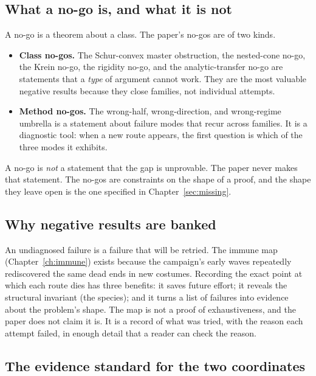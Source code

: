 \subsection{What a no-go is, and what it is not}

A no-go is a theorem about a class. The paper's no-gos are of two kinds.
\begin{itemize}
\item \textbf{Class no-gos.} The Schur-convex master obstruction, the nested-cone no-go, the
  Krein no-go, the rigidity no-go, and the analytic-transfer no-go are statements that a
  \emph{type} of argument cannot work. They are the most valuable negative results because they
  close families, not individual attempts.
\item \textbf{Method no-gos.} The wrong-half, wrong-direction, and wrong-regime umbrella is a
  statement about failure modes that recur across families. It is a diagnostic tool: when a new
  route appears, the first question is which of the three modes it exhibits.
\end{itemize}
A no-go is \emph{not} a statement that the gap is unprovable. The paper never makes that
statement. The no-gos are constraints on the shape of a proof, and the shape they leave open is
the one specified in Chapter~\ref{sec:missing}.

\subsection{Why negative results are banked}

An undiagnosed failure is a failure that will be retried. The immune map
(Chapter~\ref{ch:immune}) exists because the campaign's early waves repeatedly rediscovered the
same dead ends in new costumes. Recording the exact point at which each route dies has three
benefits: it saves future effort; it reveals the structural invariant (the species); and it turns
a list of failures into evidence about the problem's shape. The map is not a proof of
exhaustiveness, and the paper does not claim it is. It is a record of what was tried, with the
reason each attempt failed, in enough detail that a reader can check the reason.

\subsection{The evidence standard for the two coordinates}

